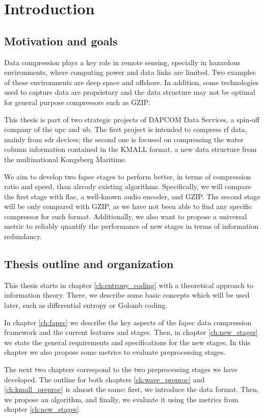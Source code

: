 \chapter{Introduction}
\section{Motivation and goals}
Data compression plays a key role in remote sensing, specially in hazardous environments, where computing power and data links are limited. Two examples of these environments are deep space and offshore. In addition, some technologies used to capture data are proprietary and the data structure may not be optimal for general purpose compressors such as GZIP.

This thesis is part of two strategic projects of DAPCOM Data Services, a spin-off company of the \acrshort{upc} and \acrshort{ub}. The first project is intended to compress \acrfull{rf} data, mainly from \acrshort{sdr} devices; the second one is focused on compressing the water column information contained in the KMALL format, a new data structure from the multinational Kongsberg Maritime.

We aim to develop two \acrshort{fapec} stages to perform better, in terms of compression ratio and speed, than already existing algorithms. Specifically, we will compare the first stage with \acrshort{flac}, a well-known audio encoder, and GZIP. The second stage will be only compared with GZIP, as we have not been able to find any specific compressor for such format. Additionally, we also want to propose a universal metric to reliably quantify the performance of new stages in terms of information redundancy.

\section{Thesis outline and organization}
This thesis starts in chapter \ref{ch:entropy_coding} with a theoretical approach to information theory. There, we describe some basic concepts which will be used later, such as differential entropy or Golomb coding.

In chapter \ref{ch:fapec} we describe the key aspects of the \acrshort{fapec} data compression framework and the current features and stages. Then, in chapter \ref{ch:new_stages} we state the general requirements and specifications for the new stages. In this chapter we also propose some metrics to evaluate preprocessing stages.

The next two chapters correspond to the two preprocessing stages we have developed. The outline for both chapters \ref{ch:wave_preproc} and \ref{ch:kmall_preproc} is almost the same: first, we introduce the data format. Then, we propose an algorithm, and finally, we evaluate it using the metrics from chapter \ref{ch:new_stages}.

